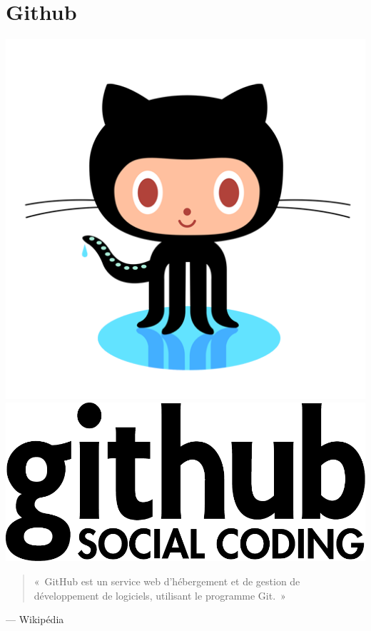 \section{Github}

\begin{frame}
\begin{center}\includegraphics[scale=0.2]{github-logo.png}\includegraphics[scale=0.4]{github-logo.pdf}\end{center}
\end{frame}

\begin{frame}
\begin{quote}«~GitHub est un service web d'hébergement et de gestion de développement de logiciels, utilisant le programme Git.~»\end{quote}
\begin{flushright}--- Wikipédia\end{flushright}
\end{frame}

